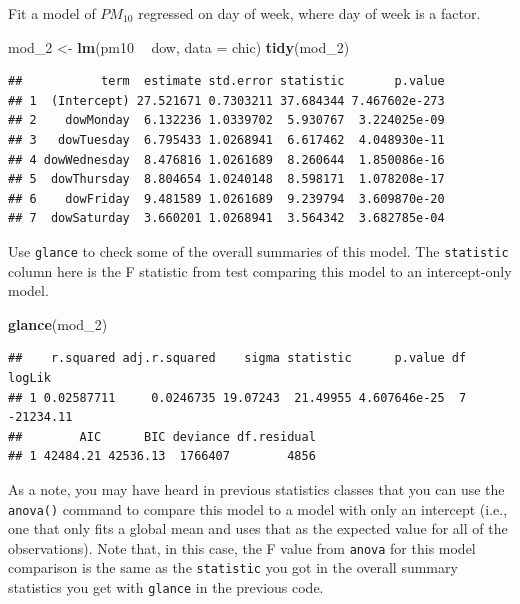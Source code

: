 \documentclass[]{book}
\makeatletter
\newenvironment{Shaded}{\begin{snugshade}}{\end{snugshade}}
\newcommand{\KeywordTok}[1]{\textcolor[rgb]{0.13,0.29,0.53}{\textbf{#1}}}
\newcommand{\DataTypeTok}[1]{\textcolor[rgb]{0.13,0.29,0.53}{#1}}
\newcommand{\DecValTok}[1]{\textcolor[rgb]{0.00,0.00,0.81}{#1}}
\newcommand{\StringTok}[1]{\textcolor[rgb]{0.31,0.60,0.02}{#1}}
\newcommand{\OperatorTok}[1]{\textcolor[rgb]{0.81,0.36,0.00}{\textbf{#1}}}
\newcommand{\NormalTok}[1]{#1}
\newenvironment{kframe}{%
\medskip{}
\setlength{\fboxsep}{.8em}
 \def\at@end@of@kframe{}%
 \ifinner\ifhmode%
  \def\at@end@of@kframe{\end{minipage}}%
  \begin{minipage}{\columnwidth}%
 \fi\fi%
 \def\FrameCommand##1{\hskip\@totalleftmargin \hskip-\fboxsep
 \colorbox{shadecolor}{##1}\hskip-\fboxsep
     \hskip-\linewidth \hskip-\@totalleftmargin \hskip\columnwidth}%
 \MakeFramed {\advance\hsize-\width
   \@totalleftmargin\z@ \linewidth\hsize
   \@setminipage}}%
 {\par\unskip\endMakeFramed%
 \at@end@of@kframe}
\renewenvironment{Shaded}{\begin{kframe}}{\end{kframe}}
\theoremstyle{definition}
\theoremstyle{definition}
\theoremstyle{definition}
\theoremstyle{remark}
\makeatother
\begin{document}
Fit a model of \(PM_{10}\) regressed on day of week, where day of week
is a factor.

\begin{Shaded}
\begin{Highlighting}[]
\NormalTok{mod_}\DecValTok{2}\NormalTok{ <-}\StringTok{ }\KeywordTok{lm}\NormalTok{(pm10 }\OperatorTok{~}\StringTok{ }\NormalTok{dow, }\DataTypeTok{data =}\NormalTok{ chic)}
\KeywordTok{tidy}\NormalTok{(mod_}\DecValTok{2}\NormalTok{)}
\end{Highlighting}
\end{Shaded}

\begin{verbatim}
##           term  estimate std.error statistic       p.value
## 1  (Intercept) 27.521671 0.7303211 37.684344 7.467602e-273
## 2    dowMonday  6.132236 1.0339702  5.930767  3.224025e-09
## 3   dowTuesday  6.795433 1.0268941  6.617462  4.048930e-11
## 4 dowWednesday  8.476816 1.0261689  8.260644  1.850086e-16
## 5  dowThursday  8.804654 1.0240148  8.598171  1.078208e-17
## 6    dowFriday  9.481589 1.0261689  9.239794  3.609870e-20
## 7  dowSaturday  3.660201 1.0268941  3.564342  3.682785e-04
\end{verbatim}

Use \texttt{glance} to check some of the overall summaries of this
model. The \texttt{statistic} column here is the F statistic from test
comparing this model to an intercept-only model.

\begin{Shaded}
\begin{Highlighting}[]
\KeywordTok{glance}\NormalTok{(mod_}\DecValTok{2}\NormalTok{)}
\end{Highlighting}
\end{Shaded}

\begin{verbatim}
##    r.squared adj.r.squared    sigma statistic      p.value df    logLik
## 1 0.02587711     0.0246735 19.07243  21.49955 4.607646e-25  7 -21234.11
##        AIC      BIC deviance df.residual
## 1 42484.21 42536.13  1766407        4856
\end{verbatim}

As a note, you may have heard in previous statistics classes that you
can use the \texttt{anova()} command to compare this model to a model
with only an intercept (i.e., one that only fits a global mean and uses
that as the expected value for all of the observations). Note that, in
this case, the F value from \texttt{anova} for this model comparison is
the same as the \texttt{statistic} you got in the overall summary
statistics you get with \texttt{glance} in the previous code.
\end{document}
